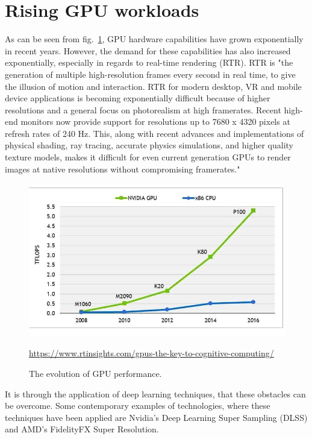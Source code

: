 \documentclass[10pt,oneside,english,a4paper]{article}
\begin{document}
\section{Rising GPU workloads} \label{rise}

As can be seen from fig.~\ref{f:graph}, GPU hardware capabilities have grown exponentially in recent years. However, the demand for these capabilities has also increased exponentially, especially in regards to real-time rendering (RTR). RTR is "the generation of multiple high-resolution frames every second in real time, to give the illusion of motion and interaction. RTR for modern desktop, VR and mobile device applications is becoming exponentially difficult because of higher resolutions and a general focus on photorealism at high framerates. Recent high-end monitors now provide support for resolutions up to 7680 x 4320 pixels at refresh rates of 240 Hz. This, along with recent advances and implementations of physical shading, ray tracing, accurate physics simulations, and higher quality texture models, makes it difficult for even current generation GPUs to render images at native resolutions without compromising framerates."\cite{9441822}

\begin{figure}[tbh]
\centering
\includegraphics[scale=0.4]{gpugraph.jpg}
\caption{The evolution of GPU performance.}
\url{https://www.rtinsights.com/gpus-the-key-to-cognitive-computing/}
\label{f:graph}
\end{figure}

It is through the application of deep learning techniques, that these obstacles can be overcome. Some contemporary examples of technologies, where these techniques have been applied are Nvidia's Deep Learning Super Sampling (DLSS) and AMD's FidelityFX Super Resolution.
\end{document}
